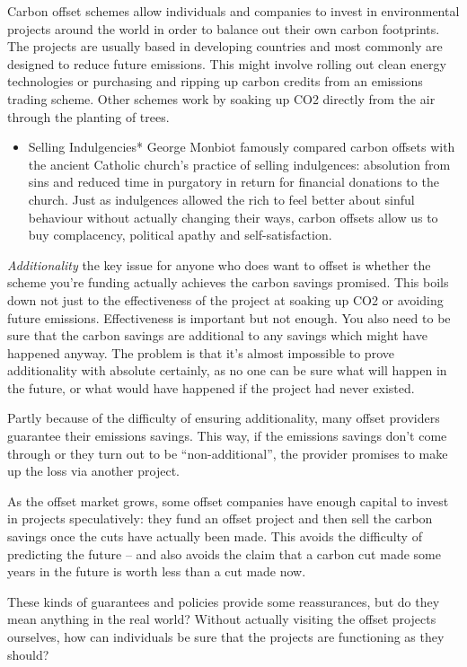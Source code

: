 \documentclass[
]{book}
\providecommand{\tightlist}{%
  \setlength{\itemsep}{0pt}\setlength{\parskip}{0pt}}
\begin{document}
Carbon offset schemes allow individuals and companies to invest in environmental projects around the world in order to balance out their own carbon footprints. The projects are usually based in developing countries and most commonly are designed to reduce future emissions. This might involve rolling out clean energy technologies or purchasing and ripping up carbon credits from an emissions trading scheme. Other schemes work by soaking up CO2 directly from the air through the planting of trees.

\begin{itemize}
\tightlist
\item
  Selling Indulgencies*
  George Monbiot famously compared carbon offsets with the ancient Catholic church's practice of selling indulgences: absolution from sins and reduced time in purgatory in return for financial donations to the church.
  Just as indulgences allowed the rich to feel better about sinful behaviour without actually changing their ways, carbon offsets allow us to buy complacency, political apathy and self-satisfaction.
\end{itemize}

\emph{Additionality}
the key issue for anyone who does want to offset is whether the scheme you're funding actually achieves the carbon savings promised. This boils down not just to the effectiveness of the project at soaking up CO2 or avoiding future emissions. Effectiveness is important but not enough. You also need to be sure that the carbon savings are additional to any savings which might have happened anyway.
The problem is that it's almost impossible to prove additionality with absolute certainly, as no one can be sure what will happen in the future, or what would have happened if the project had never existed.

Partly because of the difficulty of ensuring additionality, many offset providers guarantee their emissions savings. This way, if the emissions savings don't come through or they turn out to be ``non-additional'', the provider promises to make up the loss via another project.

As the offset market grows, some offset companies have enough capital to invest in projects speculatively: they fund an offset project and then sell the carbon savings once the cuts have actually been made. This avoids the difficulty of predicting the future -- and also avoids the claim that a carbon cut made some years in the future is worth less than a cut made now.

These kinds of guarantees and policies provide some reassurances, but do they mean anything in the real world? Without actually visiting the offset projects ourselves, how can individuals be sure that the projects are functioning as they should?
\end{document}
